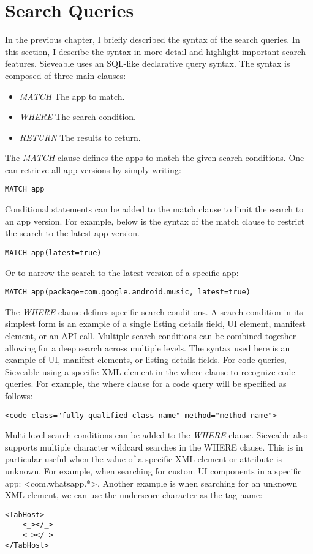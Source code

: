 \section{Search Queries}
In the previous chapter, I briefly described the syntax of the search queries.
In this section, I describe the syntax in more detail and highlight important search features.
Sieveable uses an SQL-like declarative query syntax.
The syntax is composed of three main clauses:
\begin{itemize}
	\item \textit{MATCH} The app to match.
	\item \textit{WHERE} The search condition.
	\item \textit{RETURN} The results to return.
\end{itemize}
The \textit{MATCH} clause defines the apps to match the given search conditions.
One can retrieve all app versions by simply writing:
\begin{verbatim}
MATCH app
\end{verbatim}
Conditional statements can be added to the match clause to limit the search to an app version.
For example, below is the syntax of the match clause to restrict the search to the latest app version.
\begin{verbatim}
MATCH app(latest=true)
\end{verbatim}
Or to narrow the search to the latest version of a specific app:
\begin{verbatim}
MATCH app(package=com.google.android.music, latest=true)
\end{verbatim}

The \textit{WHERE} clause defines specific search conditions. 
A search condition in its simplest form is an example of a single listing details field, UI element, manifest element, or an API call.
Multiple search conditions can be combined together allowing for a deep search across multiple levels.
The syntax used here is an example of UI, manifest elements, or listing details fields.
For code queries, Sieveable using a specific XML element in the where clause to recognize code queries.
For example, the where clause for a code query will be specified as follows:
\begin{verbatim}
<code class="fully-qualified-class-name" method="method-name">
\end{verbatim}
Multi-level search conditions can be added to the \textit{WHERE} clause.
Sieveable also supports multiple character wildcard searches in the WHERE clause.
This is in particular useful when the value of a specific XML element or attribute is unknown.
For example, when searching for custom UI components in a specific app: \textless com.whatsapp.*\textgreater.
Another example is when searching for an unknown XML element, we can use the underscore character as the tag name:
\begin{verbatim}
<TabHost>
    <_></_>
    <_></_>
</TabHost>
\end{verbatim}

